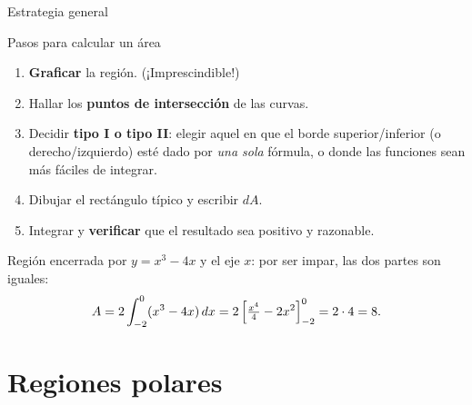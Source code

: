 \documentclass[10pt,aspectratio=169]{beamer}
\begin{document}
\begin{frame}{Estrategia general}
  \begin{block}{Pasos para calcular un área}
    \begin{enumerate}
      \item \textbf{Graficar} la región. (¡Imprescindible!)
      \item Hallar los \textbf{puntos de intersección} de las curvas.
      \item Decidir \textbf{tipo I o tipo II}: elegir aquel en que el borde superior/inferior (o derecho/izquierdo) esté
        dado por \emph{una sola} fórmula, o donde las funciones sean más fáciles de integrar.
      \item Dibujar el rectángulo típico y escribir $dA$.
      \item Integrar y \textbf{verificar} que el resultado sea positivo y razonable.
    \end{enumerate}
  \end{block}
  \begin{ejemplo}
    Región encerrada por $y=x^3-4x$ y el eje $x$: por ser impar, las dos partes son iguales:
    \[ A=2\int_{-2}^0(x^3-4x)\,dx=2\left[\tfrac{x^4}{4}-2x^2\right]_{-2}^0=2\cdot4=8. \]
  \end{ejemplo}
\end{frame}

\section{Regiones polares}
\end{document}
